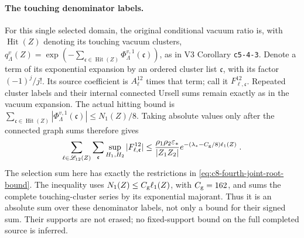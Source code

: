 \documentclass[11pt]{article}
\begin{document}
\paragraph{The touching denominator labels.}
For this single selected domain, the original conditional
vacuum ratio is, with $\operatorname{Hit}(Z)$ denoting its
touching vacuum clusters,
$q_\Lambda^v(Z)=\exp(-\sum_{\mathfrak c\in\operatorname{Hit}(Z)}
\Phi_\Lambda^{v,1}(\mathfrak c))$, as in V3
Corollary \texttt{c5-4-3}. Denote a term of its exponential
expansion by an ordered cluster list $\boldsymbol{\mathfrak c}$,
with its factor $(-1)^j/j!$. Its source coefficient is
$A_\ell^{12}$ times that term; call it
$F_{\ell,\boldsymbol{\mathfrak c}}^{12}$.
Repeated cluster labels and their internal connected Ursell
sums remain exactly as in the vacuum expansion.
The actual hitting bound is
$\sum_{\mathfrak c\in\operatorname{Hit}(Z)}
|\Phi_\Lambda^{v,1}(\mathfrak c)|\leq N_1(Z)/8$.
Taking absolute values only after the connected graph sums
therefore gives
\begin{equation}\label{eq:c8-fourth-joint-root-completed}
    \sum_{\ell\in\mathscr L_{12}(Z)}
        \sum_{\boldsymbol{\mathfrak c}}
        \sup_{H_1,H_2}
            |F_{\ell,\boldsymbol{\mathfrak c}}^{12}|
        \leq
        \frac{\rho_1\rho_2\varepsilon_*}{|Z_1Z_2|}
            e^{-(\lambda_*-C_{\rm g}/8)\ell_1(Z)}\;.
\end{equation}
The selection sum here has exactly the restrictions in
\eqref{eq:c8-fourth-joint-root-bound}. The inequality uses
$N_1(Z)\leq C_{\rm g}\ell_1(Z)$, with $C_{\rm g}=162$,
and sums the complete touching-cluster series by its
exponential majorant. Thus it is an absolute sum over these
denominator labels, not only a bound for their signed sum.
Their supports are not erased; no fixed-support bound on
the full completed source is inferred.
\end{document}
